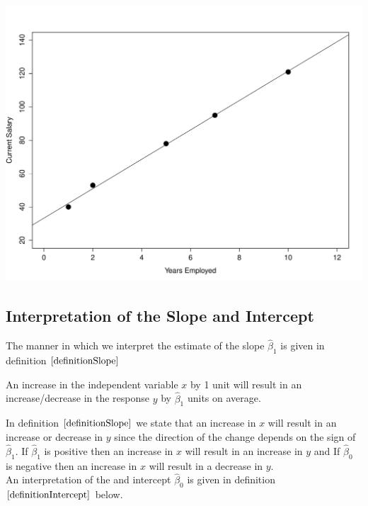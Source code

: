 \begin{example}
\begin{benumerate}
\begin{center}
\includegraphics[scale=0.4]{Section8/companysalaryexample.pdf}
\end{center}
\end{benumerate}
\end{example}

\subsection{Interpretation of the Slope and Intercept}

The manner in which we interpret the estimate of the 
slope $\hat{\beta}_{1}$ 
is given in definition $\ref{definitionSlope}$

\begin{definition}
\label{definitionSlope}	
An increase in the independent variable $x$ by 1 unit 
will result in an increase/decrease in the response $y$
by $\hat{\beta}_{1}$ units on average.
\end{definition}
\hfill

\noindent
In definition $\ref{definitionSlope}$
we state that an increase in $x$ will result in an
increase or decrease in $y$ since the direction of the change
depends on the sign of $\hat{\beta}_{1}$.
If $\hat{\beta}_{1}$ is positive then an increase in $x$ will result in an increase in $y$ and
If $\hat{\beta}_{0}$ is negative then an increase in $x$ will result in a decrease in $y$.\\

An interpretation of the and intercept $\hat{\beta}_{0}$
is given in definition $\ref{definitionIntercept}$ below.

